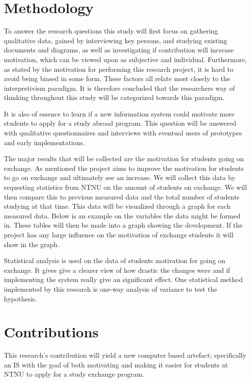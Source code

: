 \section{Methodology}
To answer the research questions this study will first focus on gathering qualitative data, gained by interviewing key persons, and studying existing documents and diagrams, as well as investigating if contribution will increase motivation, which can be viewed upon as subjective and individual. Furthermore, as stated by the motivation for performing this research project, it is hard to avoid being biased in some form. These factors all relate most closely to the interpretivism paradigm. It is therefore concluded that the researchers way of thinking throughout this study will be categorized towards this paradigm.

It is also of essence to learn if a new information system could motivate more students to apply for a study abroad program. This question will be answered with qualitative questionnaires and interviews with eventual users of prototypes and early implementations.

The major results that will be collected are the motivation for students going on exchange. As mentioned the project aims to improve the motivation for students to go on exchange and ultimately see an increase. We will collect this data by requesting statistics from NTNU on the amount of students on exchange. We will then compare this to previous measured data and the total number of students studying at that time. This data will be visualized through a graph for each measured data. Below is an example on the variables the data might be formed in. These tables will then be made into a graph showing the development. If the project has any large influence on the motivation of exchange students it will show in the graph.

Statistical analysis is used on the data of students motivation for going on exchange. It gives give a clearer view of how drastic the changes were and if implementing the system really give an significant effect. One statistical method implemented by this research is one-way analysis of variance to test the hypothesis.

\iffalse
\section{Contributions}

This research's contribution will yield a new computer based artefact; specifically an IS with the goal of both motivating and making it easier for students at NTNU to apply for a study exchange program.

